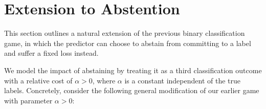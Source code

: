 \documentclass{article}[12pt]
\theoremstyle{named}
\begin{document}



\section{Extension to Abstention}
\label{sec:abstaingame}
This section outlines a natural extension of the previous binary classification game, 
in which the predictor can choose to abstain from committing to a label and suffer a fixed loss instead.

We model the impact of abstaining by treating it as a third classification outcome 
with a relative cost of $\alpha > 0$, 
where $\alpha$ is a constant independent of the true labels. 
Concretely, consider the following general modification of our earlier game with parameter $\alpha > 0$:
\end{document}
